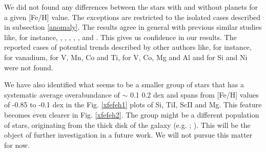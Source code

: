 \documentclass[dvips,12pt,a4paper]{report}
\begin{document}
{{We did not found any differences between the stars with and without planets for a given [Fe/H] value. The exceptions are restricted to the isolated cases described in subsection \ref{anomaly}. The results agree in general with previous similar studies like, for instance, \citet{Gonzalez-2001}, \citet{Takeda-2001},  \citet{Sadakane-2002}, \citet{Bodaghee-2003}, \citet{Beirao-2005}, \citet{Fischer-2005} and \citet{Gilli-2006}. This gives us confidence in our results. The reported cases of potential trends described by other authors like, for instance, \citet{Sadakane-2002} for vanadium, \citet{Bodaghee-2003} for V, Mn, Co and Ti, \citet{Gilli-2006} for V, Co, Mg and Al and \citet{Robinson-2006} for Si and Ni were not found.  %

We have also identified what seems to be a smaller group of stars that has a systematic average overabundance of $\sim$ 0.1 0.2 dex and spans from [Fe/H] values of -0.85 to -0.1 dex in the Fig. \ref{xfefeh1} plots of Si, TiI, ScII and Mg. This feature becomes even clearer in Fig. \ref{xfefeh2}. The group might be a different population of stars, originating from the thick disk of the galaxy (e.g. \citeauthor{Bensby-2003} \citeyear{Bensby-2003}; \citeauthor{Fuhrmann-2004} \citeyear{Fuhrmann-2004}). This will be the object of further investigation in a future work. We will not pursue this matter for now.











}}
\end{document}
